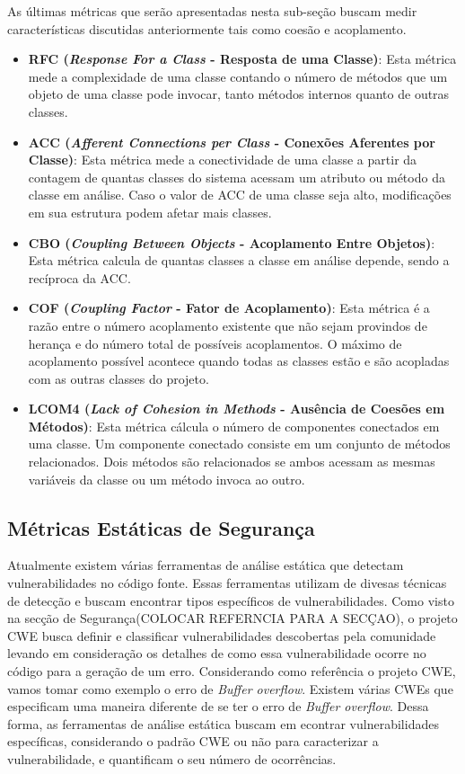 %

As últimas métricas que serão apresentadas nesta sub-seção buscam medir características discutidas anteriormente tais como coesão e acoplamento.

%

\begin{itemize}
\item \textbf{RFC (\emph{Response For a Class} - Resposta de uma Classe)}: Esta métrica mede a complexidade de uma classe contando o número de métodos que um objeto de uma classe pode invocar, tanto métodos internos quanto de outras classes.
\item \textbf{ACC (\emph{Afferent Connections per Class} - Conexões Aferentes por Classe)}: Esta métrica mede a conectividade de uma classe a partir da contagem de quantas classes do sistema acessam um atributo ou método da classe em análise. Caso o valor de ACC de uma classe seja alto, modificações em sua estrutura podem afetar mais classes.
\item \textbf{CBO (\emph{Coupling Between Objects} - Acoplamento Entre Objetos)}: Esta métrica calcula de quantas classes a classe em análise depende, sendo a recíproca da ACC.
\item \textbf{COF (\emph{Coupling Factor} - Fator de Acoplamento)}: Esta métrica é a razão entre o número acoplamento existente que não sejam provindos de herança e do número total de possíveis acoplamentos. O máximo de acoplamento possível acontece quando todas as classes estão e são acopladas com as outras classes do projeto.
\item \textbf{LCOM4 (\emph{Lack of Cohesion in Methods} - Ausência de Coesões em Métodos)}: Esta métrica cálcula o número de componentes conectados em uma classe. Um componente conectado consiste em um conjunto de métodos relacionados. Dois métodos são relacionados se ambos acessam as mesmas variáveis da classe ou um método invoca ao outro.
\end{itemize}


\subsection{Métricas Estáticas de Segurança}
\label{subsec-security-metrics}

Atualmente existem várias ferramentas de análise estática que detectam vulnerabilidades no código fonte. Essas ferramentas utilizam de divesas técnicas de detecção e buscam encontrar tipos específicos de vulnerabilidades. Como visto na secção de Segurança(COLOCAR REFERNCIA PARA A SECÇAO), o projeto CWE busca definir  e classificar vulnerabilidades descobertas pela comunidade levando em consideração os detalhes de como essa vulnerabilidade ocorre no código para a geração de um erro. Considerando como referência o projeto CWE, vamos tomar como exemplo o erro de \emph{Buffer overflow}. Existem várias CWEs que especificam uma maneira diferente de se ter o erro de \emph{Buffer overflow}. Dessa forma, as ferramentas de análise estática buscam em econtrar vulnerabilidades específicas, considerando o padrão CWE ou não para caracterizar a vulnerabilidade, e quantificam o seu número de ocorrências. 

